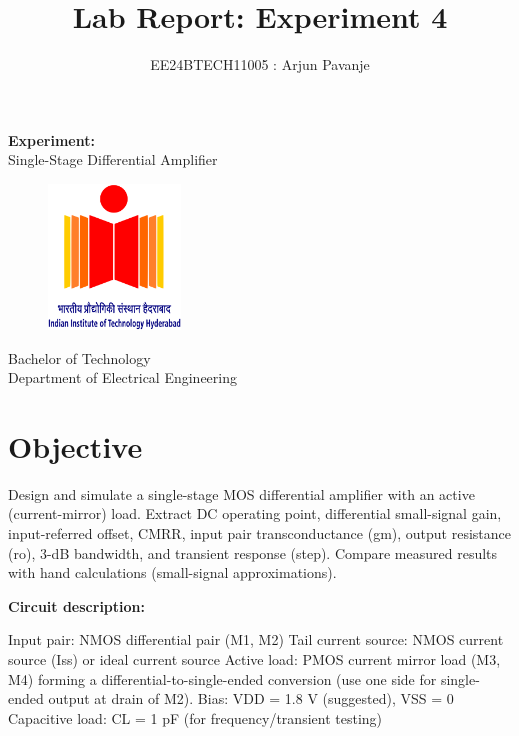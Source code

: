 \documentclass[12pt,a4paper]{article}
\title{\textbf{Lab Report: Experiment 4}}
\author{EE24BTECH11005 : Arjun Pavanje}
\begin{document}
\maketitle

\begin{center}
	\textbf{Experiment:}\\
	Single-Stage Differential Amplifier
\end{center}
\vspace{30pt}
\begin{figure}[h!]
	\centering
	\includegraphics[width = 100pt]{logo.png}\\
\end{figure}
\begin{center}
	Bachelor of Technology\\
	Department of Electrical Engineering\\
\end{center}
\newpage

\section{Objective}
Design and simulate a single-stage MOS differential amplifier with an active (current-mirror) load. Extract DC operating point, differential small-signal gain, input-referred offset, CMRR, input pair transconductance (gm), output resistance (ro), 3-dB bandwidth, and transient response (step). Compare measured results with hand calculations (small-signal approximations). \newline \newline

\textbf{Circuit description:}

Input pair: NMOS differential pair (M1, M2)
Tail current source: NMOS current source (Iss) or ideal current source
Active load: PMOS current mirror load (M3, M4) forming a differential-to-single-ended conversion (use one side for single-ended output at drain of M2).
Bias: VDD = 1.8 V (suggested), VSS = 0
Capacitive load: CL = 1 pF (for frequency/transient testing) \newline \newline
\end{document}
